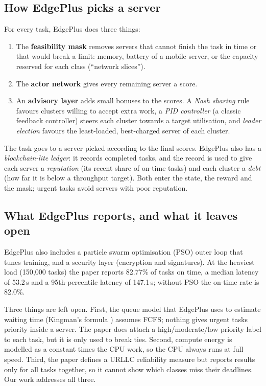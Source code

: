\documentclass[11pt]{article}
\theoremstyle{definition}
\begin{document}
\subsection{How EdgePlus picks a server}
For every task, EdgePlus does three things:
\begin{enumerate}
\item The \textbf{feasibility mask} removes servers that cannot finish the task in time or that would break a
limit: memory, battery of a mobile server, or the capacity reserved for each class (``network slices'').
\item The \textbf{actor network} gives every remaining server a score.
\item An \textbf{advisory layer} adds small bonuses to the scores. A \emph{Nash sharing} rule favours clusters
willing to accept extra work, a \emph{PID controller} (a classic feedback controller) steers each cluster towards
a target utilisation, and \emph{leader election} favours the least-loaded, best-charged server of each cluster.
\end{enumerate}
The task goes to a server picked according to the final scores. EdgePlus also has a \emph{blockchain-lite ledger}:
it records completed tasks, and the record is used to give each server a \emph{reputation} (its recent share of
on-time tasks) and each cluster a \emph{debt} (how far it is below a throughput target). Both enter the state,
the reward and the mask; urgent tasks avoid servers with poor reputation.

\subsection{What EdgePlus reports, and what it leaves open}
EdgePlus also includes a particle swarm optimisation (PSO) outer loop that tunes training, and a security layer
(encryption and signatures). At the heaviest load (150{,}000 tasks) the paper reports 82.77\% of tasks on time,
a median latency of 53.2\,s and a 95th-percentile latency of 147.1\,s; without PSO the on-time rate is 82.0\%.

Three things are left open. First, the queue model that EdgePlus uses to estimate waiting time (Kingman's
formula \cite{kingman1961}) assumes FCFS; nothing gives urgent tasks priority inside a server. The paper does
attach a high/moderate/low priority label to each task, but it is only used to break ties. Second, compute
energy is modelled as a constant times the CPU work, so the CPU always runs at full speed. Third, the paper
defines a URLLC reliability measure but reports results only for all tasks together, so it cannot show which
classes miss their deadlines. Our work addresses all three.
\end{document}
